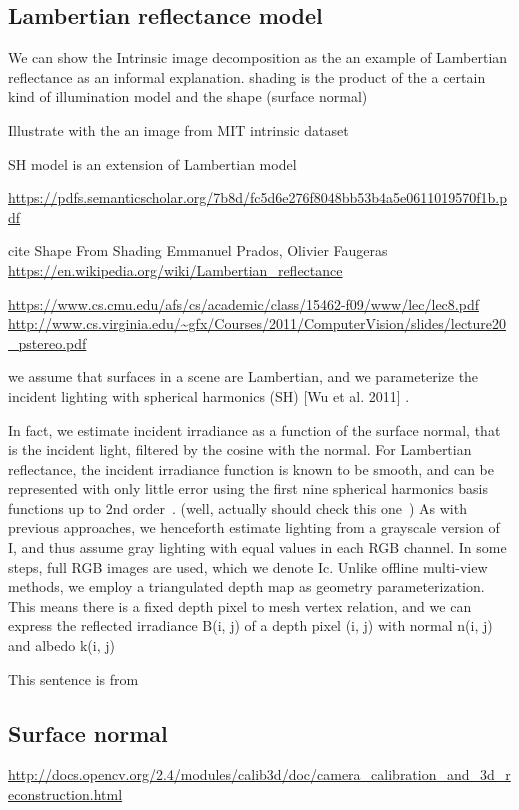 \subsection{Lambertian reflectance model}
We can show the Intrinsic image decomposition as the an example of Lambertian reflectance as an informal explanation. shading is the product of the a certain kind of illumination model and the shape (surface normal)~\cite{barron2015shape}

Illustrate with the an image from MIT intrinsic dataset~\cite{grosse2009ground}

SH model is an extension of Lambertian model

  \url{https://pdfs.semanticscholar.org/7b8d/fc5d6e276f8048bb53b4a5e0611019570f1b.pdf}
\cite{basri2003lambertian}

cite Shape From Shading Emmanuel Prados, Olivier Faugeras
\url{https://en.wikipedia.org/wiki/Lambertian_reflectance}

\url{https://www.cs.cmu.edu/afs/cs/academic/class/15462-f09/www/lec/lec8.pdf}
\url{http://www.cs.virginia.edu/~gfx/Courses/2011/ComputerVision/slides/lecture20_pstereo.pdf}


we assume that surfaces in a scene are Lambertian, and we parameterize the incident lighting with spherical harmonics (SH) [Wu et al. 2011] \cite{wu2011shading}.

In fact, we estimate incident irradiance as a function of the surface normal, that is the incident light, filtered by the cosine with the normal. For Lambertian reflectance, the incident irradiance function is known to be smooth, and can be represented with only little error using the first nine spherical harmonics basis functions up to 2nd order~\cite{ramamoorthi2001efficient}. (well, actually should check this one~\cite{ramamoorthi2001relationship})
As with previous approaches, we henceforth estimate lighting from a grayscale version of I, and thus assume gray lighting with equal values in each RGB channel. In some steps, full RGB images are used, which we denote Ic. Unlike offline multi-view methods, we employ a triangulated depth map as geometry parameterization. This means there is a fixed depth pixel to mesh vertex relation, and we can express the reflected irradiance B(i, j) of a depth pixel (i, j) with normal n(i, j) and albedo k(i, j)

This sentence is from\cite{wu2014real}


\subsection{Surface normal}
\url{http://docs.opencv.org/2.4/modules/calib3d/doc/camera_calibration_and_3d_reconstruction.html}

